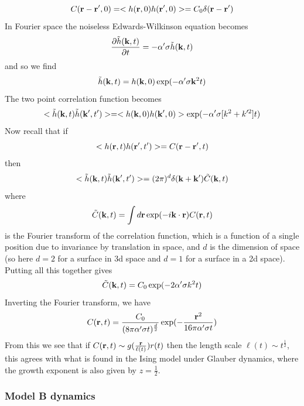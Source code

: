 \begin{equation}
    C({\bf r}-{\bf r}',0)= < h({\bf r},0)h({\bf r}',0)> =C_0 \delta({\bf r}-{\bf r}')
\end{equation}
In Fourier space the noiseless Edwards-Wilkinson equation becomes
\begin{equation}
    \frac{\partial\tilde h({\bf k},t)}{\partial t} = -\alpha'\sigma \tilde h({\bf k},t) 
\end{equation}
and so we find
\begin{equation}
    \tilde h({\bf k},t) = h({\bf k},0)\exp(-\alpha'\sigma{\bf k}^2 t)
\end{equation}
The two point correlation function becomes
\begin{equation}
    < \tilde h({\bf k},t)\tilde h({\bf k}',t')> = < h({\bf k},0)h({\bf k}',0)> \exp(-    \alpha'\sigma[k^2+k'^2] t)
\end{equation}
Now recall that if 
\begin{equation}
    <  h({\bf r},t) h({\bf r}',t')> =C({\bf r}-{\bf r}',t)
\end{equation}
then
\begin{equation}
    < \tilde h({\bf k},t)\tilde h({\bf k}',t')>= (2\pi)^d \delta({\bf k}+{\bf k}') \tilde C({\bf k},t)
\end{equation}
where 
\begin{equation}
    \tilde C({\bf k},t)= \int d{\bf r} \exp(-i{\bf k}\cdot {\bf r})C({\bf r},t)
\end{equation}
is the Fourier transform of the correlation function, which is a function of a single position due to invariance by translation in space, and $d$ is the dimension of space (so here $d=2$ for a surface in 3d space and $d=1$ for a surface in a 2d space). Putting all this together gives
\begin{equation}
    \tilde C({\bf k},t)= C_0 \exp(-2\alpha'\sigma k^2 t)
\end{equation}
Inverting the Fourier transform, we have
\begin{equation}
    C({\bf r},t)= \frac{C_0}{(8\pi \alpha'\sigma t)^{\frac{d}{2}}} \exp(-\frac{{\bf r}^2}{16\pi \alpha'\sigma t})
\end{equation}
From this we see that if $C({\bf r},t)\sim g(\frac{{\bf r}}{\ell(t)})r(t)$ then the length scale $\ell(t)\sim t^{\frac{1}{2}}$, this agrees with what is found in the Ising model under Glauber dynamics, where the growth exponent is also given by $z=\frac{1}{2}$\cite{paul_domain_2005}.

    \subsubsection{Model B dynamics}

